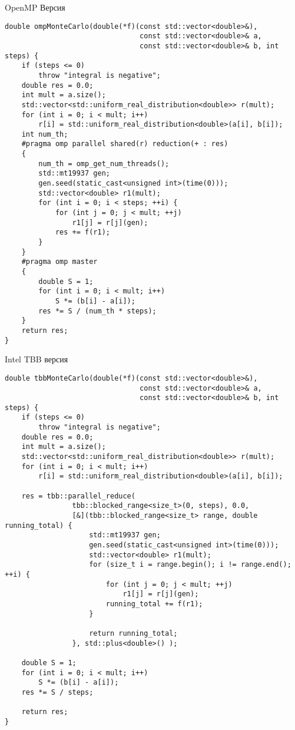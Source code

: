 \documentclass{report}
\begin{document}
\par OpenMP Версия
\begin{lstlisting}
double ompMonteCarlo(double(*f)(const std::vector<double>&),
                                const std::vector<double>& a,
                                const std::vector<double>& b, int steps) {
    if (steps <= 0)
        throw "integral is negative";
    double res = 0.0;
    int mult = a.size();
    std::vector<std::uniform_real_distribution<double>> r(mult);
    for (int i = 0; i < mult; i++)
        r[i] = std::uniform_real_distribution<double>(a[i], b[i]);
    int num_th;
    #pragma omp parallel shared(r) reduction(+ : res)
    {
        num_th = omp_get_num_threads();
        std::mt19937 gen;
        gen.seed(static_cast<unsigned int>(time(0)));
        std::vector<double> r1(mult);
        for (int i = 0; i < steps; ++i) {
            for (int j = 0; j < mult; ++j)
                r1[j] = r[j](gen);
            res += f(r1);
        }
    }
    #pragma omp master
    {
        double S = 1;
        for (int i = 0; i < mult; i++)
            S *= (b[i] - a[i]);
        res *= S / (num_th * steps);
    }
    return res;
}
\end{lstlisting}

\par Intel TBB версия
\begin{lstlisting}
double tbbMonteCarlo(double(*f)(const std::vector<double>&),
                                const std::vector<double>& a,
                                const std::vector<double>& b, int steps) {
    if (steps <= 0)
        throw "integral is negative";
    double res = 0.0;
    int mult = a.size();
    std::vector<std::uniform_real_distribution<double>> r(mult);
    for (int i = 0; i < mult; i++)
        r[i] = std::uniform_real_distribution<double>(a[i], b[i]);

    res = tbb::parallel_reduce(
                tbb::blocked_range<size_t>(0, steps), 0.0,
                [&](tbb::blocked_range<size_t> range, double running_total) {
                    std::mt19937 gen;
                    gen.seed(static_cast<unsigned int>(time(0)));
                    std::vector<double> r1(mult);
                    for (size_t i = range.begin(); i != range.end(); ++i) {
                        for (int j = 0; j < mult; ++j)
                            r1[j] = r[j](gen);
                        running_total += f(r1);
                    }

                    return running_total;
                }, std::plus<double>() );

    double S = 1;
    for (int i = 0; i < mult; i++)
        S *= (b[i] - a[i]);
    res *= S / steps;

    return res;
}
\end{lstlisting}
\end{document}
